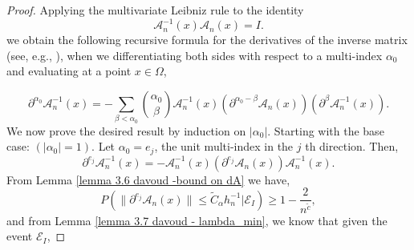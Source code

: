 \documentclass{article}
\begin{document}
\begin{proof}

Applying the multivariate Leibniz rule to the identity
$$
\mathscr{A}_n^{-1}(x) \mathscr{A}_n(x)=I .
$$
we obtain the following recursive formula for the derivatives of the inverse matrix (see, e.g., \cite{hormander1983analysis}), when we differentiating both sides with respect to a multi-index $\alpha_0$ and evaluating at a point $x \in \Omega$,

$$
\partial^{\alpha_0} \mathscr{A}_n^{-1}(x)=-\sum_{\beta<\alpha_0}\binom{\alpha_0}{\beta} \mathscr{A}_n^{-1}(x)\left(\partial^{\alpha_0-\beta} \mathscr{A}_n(x)\right)\left(\partial^\beta \mathscr{A}_n^{-1}(x)\right) .
$$
We now prove the desired result by induction on $\left|\alpha_0\right|$.
Starting with the base case: $\left(\left|\alpha_0\right|=1\right)$.
Let $\alpha_0=e_j$, the unit multi-index in the $j$ th direction. 
Then,
$$
\partial^{e_j} \mathscr{A}_n^{-1}(x)=-\mathscr{A}_n^{-1}(x)\left(\partial^{e_j} \mathscr{A}_n(x)\right) \mathscr{A}_n^{-1}(x).
$$
From Lemma \ref{lemma 3.6 davoud -bound on dA} we have, 
\begin{equation}
    P\left(\|\partial^{e_j} \mathscr{A}_n(x)\|\leq \tilde{C}_{\alpha} h_n^{-1}\Big|\mathscr{E}_I\right)\geq 1-\frac{2}{n^{\tilde{c} }},
    \label{eq:result lemma 5 in lemma 8}
\end{equation}
and from Lemma \ref{lemma 3.7 davoud - lambda_min}, we know that given the event $\mathscr{E}_I$, 


\end{proof}
\end{document}
